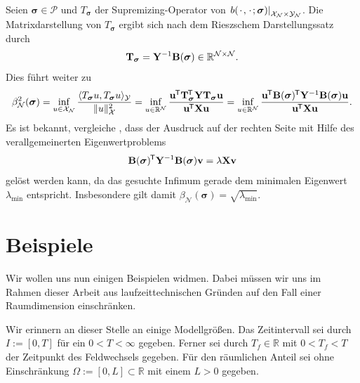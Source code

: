\documentclass[../main.tex]{subfiles}
\begin{document}
Seien $\bm \sigma \in \mathcal P$ und $T_{\bm \sigma}$ der Supremizing-Operator von $\left.b({\mkern2mu\cdot\mkern2mu}, {\mkern2mu\cdot\mkern2mu}; \bm \sigma)\right|_{\mathcal X_{\mathcal N} \times \mathcal Y_{\mathcal N}}$.
Die Matrixdarstellung von $T_{\bm \sigma}$ ergibt sich nach dem Rieszschem Darstellungssatz durch
\begin{equation}
    \mathbf{T}_{\bm \sigma} = \mathbf{Y}^{-1} \mathbf{B}(\bm \sigma) \in \mathbb{R}^{\mathcal N \times \mathcal N}.
\end{equation}
Dies führt weiter zu
\begin{equation}
    \beta_{\mathcal N}^{2}(\bm \sigma)
    = \inf_{u \in \mathcal X_{\mathcal N}} \frac{\langle T_{\bm \sigma} u,T_{\bm \sigma} u\rangle_{\mathcal Y}}{\lVert u\rVert_{\mathcal X}^{2}}
    = \inf_{u \in \mathbb{R}^{\mathcal N}} \frac{\mathbf{u}^{\mkern-1.5mu\mathsf{T}} \mathbf{T}_{\bm \sigma}^{\mkern-1.5mu\mathsf{T}} \mathbf{Y} \mathbf{T}_{\bm \sigma} \mathbf{u}}{\mathbf{u}^{\mkern-1.5mu\mathsf{T}} \mathbf{X} \mathbf{u}}
    = \inf_{u \in \mathbb{R}^{\mathcal N}} \frac{\mathbf{u}^{\mkern-1.5mu\mathsf{T}} \mathbf{B}(\bm \sigma)^{\mkern-1.5mu\mathsf{T}} \mathbf{Y}^{-1} \mathbf{B}(\bm \sigma) \mathbf{u}}{\mathbf{u}^{\mkern-1.5mu\mathsf{T}} \mathbf{X} \mathbf{u}}.
\end{equation}
Es ist bekannt, vergleiche \cite[Subsection 1.3.5]{Patera:2007un}, dass der Ausdruck auf der rechten Seite mit Hilfe des verallgemeinerten Eigenwertproblems
\begin{equation}
    \mathbf{B}(\bm \sigma)^{\mkern-1.5mu\mathsf{T}} \mathbf{Y}^{-1} \mathbf{B}(\bm \sigma) \mathbf{v} = \lambda \mathbf{X} \mathbf{v}
\end{equation}
gelöst werden kann, da das gesuchte Infimum gerade dem minimalen Eigenwert $\lambda_{\min}$ entspricht.
Insbesondere gilt damit $\beta_{\mathcal N}(\bm \sigma) = \sqrt{\lambda_{\min}}$.


\section{Beispiele} %
\label{sec:cha4_galerkin:beispiele}

Wir wollen uns nun einigen Beispielen widmen.
Dabei müssen wir uns im Rahmen dieser Arbeit aus laufzeittechnischen Gründen auf den Fall einer Raumdimension einschränken.

Wir erinnern an dieser Stelle an einige Modellgrößen.
Das Zeitintervall sei durch $I := [0, T]$ für ein $0 < T < \infty$ gegeben.
Ferner sei durch $T_{f} \in \mathbb{R}$ mit $0 < T_{f} < T$ der Zeitpunkt des Feldwechsels gegeben.
Für den räumlichen Anteil sei ohne Einschränkung $\Omega := [0, L] \subset \mathbb{R}$ mit einem $L > 0$ gegeben.
\end{document}
